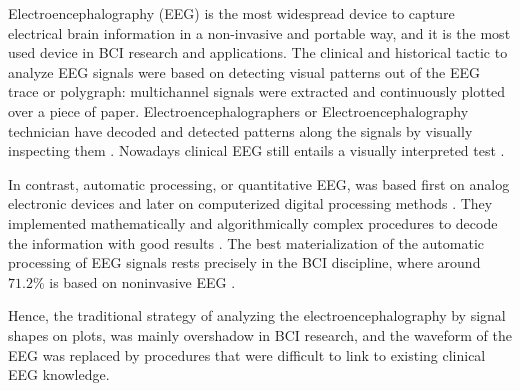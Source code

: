 


Electroencephalography (EEG) is the most widespread device to capture electrical brain information in a non-invasive and portable way, and it is the most used device in BCI research and applications.  The clinical and historical tactic to analyze EEG signals were based on detecting visual patterns out of the EEG trace or polygraph\cite{Hartman2005}: multichannel signals were extracted and continuously plotted over a piece of paper. Electroencephalographers or Electroencephalography technician have decoded and detected patterns along the signals by visually inspecting them \cite{Schomer2010}.   Nowadays clinical EEG still entails a visually interpreted test \cite{Hartman2005}.

In contrast, automatic processing, or quantitative EEG, was based first on analog electronic devices and later on computerized digital processing methods \cite{Jansen1991}.  They implemented mathematically and algorithmically complex procedures to decode the information with good results \cite{Yuste2017}.  The best materialization of the automatic processing of EEG signals rests precisely in the BCI discipline, where around $71.2\%$ is based on noninvasive EEG \cite{Guger2017}.  


Hence, the traditional strategy of analyzing the electroencephalography by signal shapes on plots, was mainly overshadow in BCI research, and the waveform of the EEG was replaced by procedures that were difficult to link to existing clinical EEG knowledge.  

